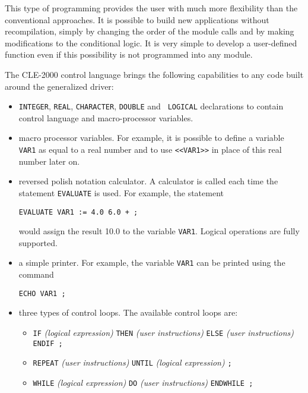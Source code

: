 This type of programming provides the user with much more flexibility  than
the conventional approaches. It is possible to build new applications without
recompilation, simply by changing the order of the module calls and by making
modifications to the conditional logic. It is very simple to develop a
user-defined function even if this possibility is not programmed into any
module.

The CLE-2000 control language brings the following capabilities to any code built around the generalized driver:

\begin{itemize}
\item {\tt INTEGER}, {\tt REAL}, {\tt CHARACTER}, {\tt DOUBLE} and  {\tt
LOGICAL} declarations to contain control language and macro-processor variables.

\item macro processor variables. For example, it is possible to define a variable {\tt VAR1} as equal to a real number and to use {\tt <<VAR1>>} in place of this real number later on.

\item reversed polish notation calculator. A calculator is called each time the statement {\tt EVALUATE} is used. For example, the statement
  \begin{verbatim}
EVALUATE VAR1 := 4.0 6.0 + ;
  \end{verbatim}
would assign the result 10.0 to the variable {\tt VAR1}. Logical operations are fully supported.

\item a simple printer. For example, the variable {\tt VAR1} can be printed using the command
  \begin{verbatim}
ECHO VAR1 ;
  \end{verbatim}

\item three types of control loops. The available control loops are:

\begin{itemize}
\item {\tt IF} {\sl (logical expression)} {\tt THEN} {\sl (user instructions)} {\tt ELSE} {\sl (user instructions)} {\tt ENDIF ;}
\item {\tt REPEAT} {\sl (user instructions)} {\tt UNTIL} {\sl (logical expression)} {\tt ;}
\item {\tt WHILE} {\sl (logical expression)} {\tt DO} {\sl (user instructions)} {\tt ENDWHILE ;}
\end{itemize}

\end{itemize}

